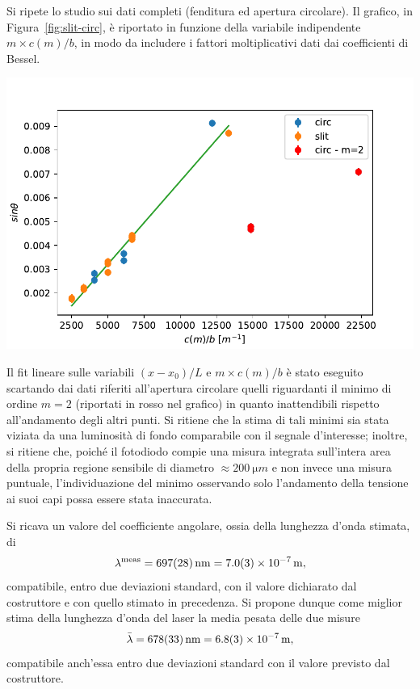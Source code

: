 \documentclass[10pt,oneside,a4paper]{article}
\newenvironment{Figure}
  {\par\medskip\noindent\minipage{\linewidth}}
  {\endminipage\par\medskip}
\begin{document}
\begin{multicols}{2}
Si ripete lo studio sui dati completi (fenditura ed apertura circolare). Il grafico, in Figura~\ref{fig:slit-circ}, è riportato in funzione della variabile indipendente $m\times c(m)/b$, in modo da includere i fattori moltiplicativi dati dai coefficienti di Bessel. 
\begin{Figure}
	\begin{center}
	\includegraphics[width=1.1\linewidth]{slit-circ}
	\label{fig:slit-circ}
	\end{center}
\end{Figure}
Il fit lineare sulle variabili $(x-x_0)/L$ e $m \times c(m)/b$ è stato eseguito scartando dai dati riferiti all'apertura circolare quelli riguardanti il minimo di ordine $m=2$ (riportati in rosso nel grafico) in quanto inattendibili rispetto all'andamento degli altri punti. Si ritiene che la stima di tali minimi sia stata viziata da una luminosità di fondo comparabile con il segnale d'interesse; inoltre, si ritiene che, poiché il fotodiodo compie una misura integrata sull'intera area della propria regione sensibile di diametro $\approx \SI{200}{\micro m}$ e non invece una misura puntuale, l'individuazione del minimo osservando solo l'andamento della tensione ai suoi capi possa essere stata inaccurata. 

Si ricava un valore del coefficiente angolare, ossia della lunghezza d'onda stimata, di
\[
\lambda^{\text{meas}} = \SI{697 \pm 28}{nm} = \SI{7.0 \pm 0.3 e-7}{m},
\]
compatibile, entro due deviazioni standard, con il valore dichiarato dal costruttore e con quello stimato in precedenza. Si propone dunque come miglior stima della lunghezza d'onda del laser la media pesata delle due misure
\[
\bar \lambda = \SI{678 \pm 33}{nm} = \SI{6.8 \pm 0.3 e-7}{m},
\]
compatibile anch'essa entro due deviazioni standard con il valore previsto dal costruttore.


\end{multicols}
\end{document}
